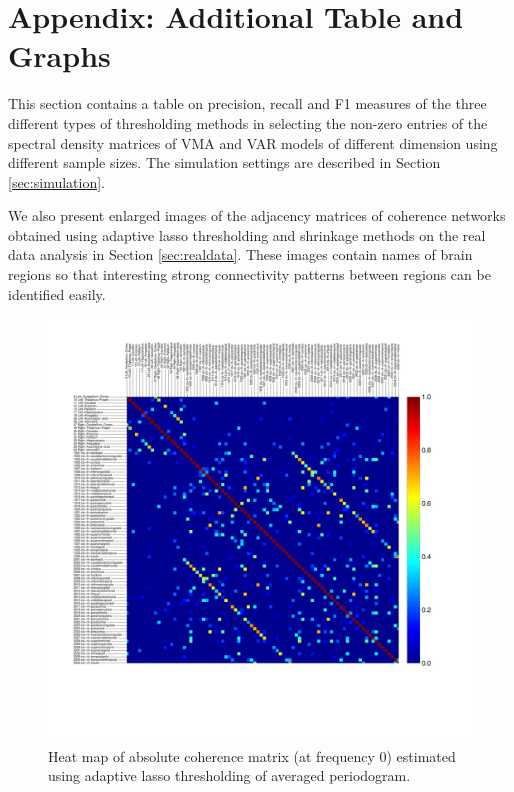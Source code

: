 \section{Appendix: Additional Table and Graphs}\label{appendix:more_tables}
This section contains a table on precision, recall and F1 measures of the three different types of thresholding methods in selecting the non-zero entries of the spectral density matrices of VMA and VAR models of different dimension using different  sample sizes. The simulation settings are described in Section \ref{sec:simulation}. 

We also present enlarged images of the adjacency matrices of coherence networks obtained using adaptive lasso thresholding and shrinkage methods on the real data analysis in Section \ref{sec:realdata}. These images contain names of brain regions so that interesting strong connectivity patterns between regions can be identified easily.



\begin{figure}[p]
    \centering
    \includegraphics[width=1.1\textwidth]{img/al_hm_0.pdf}
    \caption{Heat map of absolute coherence matrix (at frequency $0$) estimated using adaptive lasso thresholding of averaged periodogram.}
    \label{fig:realdatafullalasso}
\end{figure}


